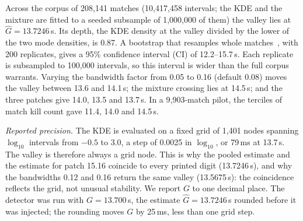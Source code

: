 Across the corpus of 208,141 matches (10,417,458 intervals; the KDE and the mixture are fitted to a
seeded subsample of 1,000,000 of them) the valley lies at $\hat G = 13.7246$\,s. Its depth, the KDE
density at the valley divided by the lower of the two mode densities, is 0.87.
A bootstrap that resamples whole matches~\cite{efron1993bootstrap}, with 200 replicates, gives a 95\%
confidence interval (CI) of 12.2--15.7\,s. Each replicate is subsampled to 100,000 intervals, so this
interval is wider than the full corpus warrants.
Varying the bandwidth factor from 0.05 to 0.16 (default 0.08) moves the valley between 13.6 and
14.1\,s; the mixture crossing lies at 14.5\,s; and the three patches give 14.0, 13.5 and 13.7\,s.
In a 9,903-match pilot, the terciles of match kill count gave 11.4, 14.0 and 14.5\,s.

\emph{Reported precision.} The KDE is evaluated on a fixed grid of 1,401 nodes spanning
$\log_{10}$ intervals from $-0.5$ to $3.0$, a step of 0.0025 in $\log_{10}$, or 79\,ms at 13.7\,s.
The valley is therefore always a grid node. This is why the pooled estimate and the estimate for patch
15.16 coincide to every printed digit (13.7246\,s), and why the bandwidths 0.12 and 0.16 return the
same valley (13.5675\,s): the coincidence reflects the grid, not unusual stability. We report $G$ to one
decimal place. The detector was run with $G = 13.700$\,s, the estimate $\hat G = 13.7246$\,s rounded
before it was injected; the rounding moves $G$ by 25\,ms, less than one grid step.

